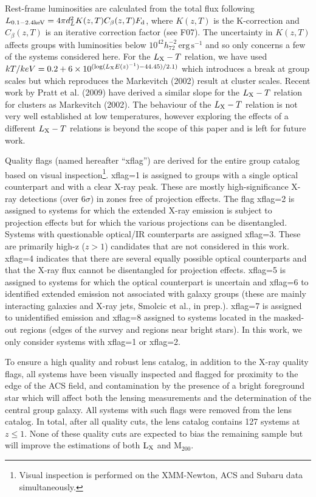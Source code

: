 \documentclass[12pt]{emulateapj}
\newcommand{\pgroup}{127 }      %
\newcommand{\lum}{h_{72}^{-2}\,\mathrm{erg}\,\mathrm{s}^{-1}}
\newcommand{\lx}{$\rm{L}_{\rm X}$ }
\begin{document}
Rest-frame luminosities are calculated from the total flux following
$L_{0.1-2.4 \rm keV} = 4\pi d_L^2 K(z,T) C_{\beta}(z,T) F_{\rm d}$,
where $K(z,T)$ is the K-correction and $C_{\beta}(z,T)$ is an
iterative correction factor (see F07). The uncertainty in $K(z,T)$
affects groups with luminosities below $10^{42} \lum$ and so only
concerns a few of the systems considered here. For the $L_{\rm X}-T$
relation, we have used $kT/keV=0.2+6\times10^{(\log (L_{\rm X}
  E(z)^{-1})-44.45)/2.1)}$ which introduces a break at group scales
\citep[as discussed in][]{Voit:2005} but which reproduces the
Markevitch (2002) result at cluster scales. Recent work by Pratt et
al. (2009) have derived a similar slope for the $L_{\rm X}-T$ relation
for clusters as Markevitch (2002). The behaviour of the $L_{\rm X}-T$
relation is not very well established at low temperatures, however
exploring the effects of a different $L_{\rm X}-T$ relations is beyond
the scope of this paper and is left for future work.

Quality flags (named hereafter ``{\sc xflag}'') are derived for the
entire group catalog based on visual inspection\footnote[5]{Visual
  inspection is performed on the XMM-Newton, ACS and Subaru data
  simultaneously.}. {\sc xflag=1} is assigned to groups with a single
optical counterpart and with a clear X-ray peak. These are mostly
high-significance X-ray detections (over 6$\sigma$) in zones free of
projection effects. The flag {\sc xflag=2} is assigned to systems for
which the extended X-ray emission is subject to projection effects but
for which the various projections can be disentangled. Systems with
questionable optical/IR counterparts are assigned {\sc xflag=3}. These
are primarily high-z ($z>1$) candidates that are not considered in
this work. {\sc xflag=4} indicates that there are several equally
possible optical counterparts and that the X-ray flux cannot be
disentangled for projection effects. {\sc xflag=5} is assigned to
systems for which the optical counterpart is uncertain and {\sc
  xflag=6} to identified extended emission not associated with galaxy
groups (these are mainly interacting galaxies and X-ray jets, Smolcic
et al., in prep.). {\sc xflag=7} is assigned to unidentified emission
and {\sc xflag=8} assigned to systems located in the masked-out
regions (edges of the survey and regions near bright stars). In this
work, we only consider systems with {\sc xflag}=1 or {\sc xflag}=2.

To ensure a high quality and robust lens catalog, in addition to the
X-ray quality flags, all systems have been visually inspected and
flagged for proximity to the edge of the ACS field, and contamination
by the presence of a bright foreground star which will affect both the
lensing measurements and the determination of the central group
galaxy. All systems with such flags were removed from the lens
catalog. In total, after all quality cuts, the lens catalog contains
\pgroup systems at $z \leq 1$. None of these quality cuts are expected
to bias the remaining sample but will improve the estimations of both
\lx and M$_{200}$.
\end{document}
